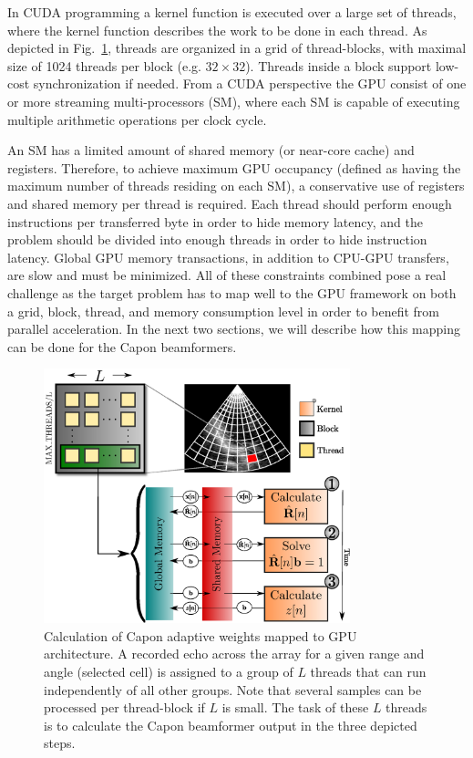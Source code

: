 \documentclass[journal]{IEEEtran}
\begin{document}
In CUDA programming a kernel function is executed over a large set of threads, where the kernel function describes the work to be done in each thread. As depicted in Fig.\ \ref{fig:gpulayout}, threads are organized in a grid of thread-blocks, with maximal size of 1024 threads per block (e.g. $32\times32$). Threads inside a block support low-cost synchronization if needed. From a CUDA perspective the GPU consist of one or more streaming multi-processors (SM), where each SM is capable of executing multiple arithmetic operations per clock cycle.

An SM has a limited amount of shared memory (or near-core cache) and registers. Therefore, to achieve maximum GPU occupancy (defined as having the maximum number of threads residing on each SM), a conservative use of registers and shared memory per thread is required. Each thread should perform enough instructions per transferred byte in order to hide memory latency, and the problem should be divided into enough threads in order to hide instruction latency. Global GPU memory transactions, in addition to CPU-GPU transfers, are slow and must be minimized. All of these constraints combined pose a real challenge as the target problem has to map well to the GPU framework on both a grid, block, thread, and memory consumption level in order to benefit from parallel acceleration. In the next two sections, we will describe how this mapping can be done for the Capon beamformers.    

\begin{figure}
\centerline{\includegraphics[width=3.5in]{gfx/gpu_layout_vertical_2.eps}}
\caption{Calculation of Capon adaptive weights mapped to GPU architecture. A recorded echo across the array for a given range and angle (selected cell) is assigned to a group of $L$ threads that can run independently of all other groups. Note that several samples can be processed per thread-block if $L$ is small. The task of these $L$ threads is to calculate the Capon beamformer output in the three depicted steps.}
\label{fig:gpulayout}
\end{figure}
\end{document}
